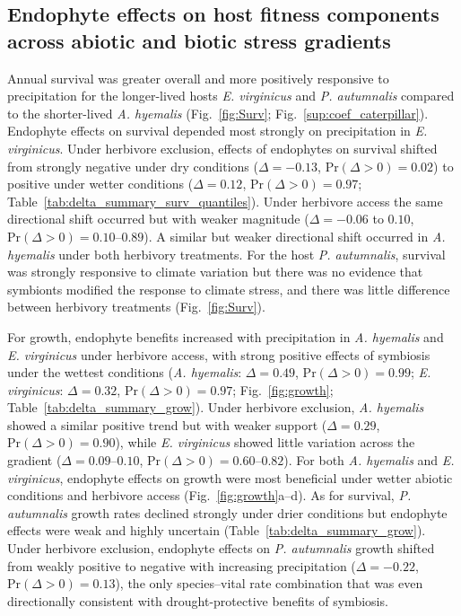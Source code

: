 \documentclass[12pt]{article}\usepackage[]{graphicx}\usepackage[dvipsnames]{xcolor}
\begin{document}
\subsection*{Endophyte effects on host fitness components across abiotic and biotic stress gradients}
Annual survival was greater overall and more positively responsive to precipitation for the longer-lived hosts \textit{E. virginicus} and \textit{P. autumnalis} compared to the shorter-lived \textit{A. hyemalis} (Fig.~\ref{fig:Surv}; Fig.~\ref{sup:coef_caterpillar}).
Endophyte effects on survival depended most strongly on precipitation in \textit{E. virginicus}. 
Under herbivore exclusion, effects of endophytes on survival shifted from strongly negative under dry conditions ($\Delta = -0.13$, $\mathrm{Pr}(\Delta > 0) = 0.02$) to positive under wetter conditions ($\Delta = 0.12$, $\mathrm{Pr}(\Delta > 0) = 0.97$; Table~\ref{tab:delta_summary_surv_quantiles}). 
Under herbivore access the same directional shift occurred but with weaker magnitude ($\Delta = -0.06$ to $0.10$, $\mathrm{Pr}(\Delta > 0) = 0.10$--$0.89$). 
A similar but weaker directional shift occurred in \textit{A. hyemalis} under both herbivory treatments.
For the host \textit{P. autumnalis}, survival was strongly responsive to climate variation but there was no evidence that symbionts modified the response to climate stress, and there was little difference between herbivory treatments (Fig.~\ref{fig:Surv}).

For growth, endophyte benefits increased with precipitation in \textit{A. hyemalis} and \textit{E. virginicus} under herbivore access, with strong positive effects of symbiosis under the wettest conditions (\textit{A. hyemalis}: $\Delta = 0.49$, $\mathrm{Pr}(\Delta > 0) = 0.99$; \textit{E. virginicus}: $\Delta = 0.32$, $\mathrm{Pr}(\Delta > 0) = 0.97$; Fig.~\ref{fig:growth}; Table~\ref{tab:delta_summary_grow}). 
Under herbivore exclusion, \textit{A. hyemalis} showed a similar positive trend but with weaker support ($\Delta = 0.29$, $\mathrm{Pr}(\Delta > 0) = 0.90$), while \textit{E. virginicus} showed little variation across the gradient ($\Delta = 0.09$--$0.10$, $\mathrm{Pr}(\Delta > 0) = 0.60$--$0.82$). 
For both \textit{A. hyemalis} and \textit{E. virginicus}, endophyte effects on growth were most beneficial under wetter abiotic conditions and herbivore access (Fig.~\ref{fig:growth}a--d). 
As for survival, \textit{P. autumnalis} growth rates declined strongly under drier conditions but endophyte effects were weak and highly uncertain (Table~\ref{tab:delta_summary_grow}). 
Under herbivore exclusion, endophyte effects on \textit{P. autumnalis} growth shifted from weakly positive to negative with increasing precipitation ($\Delta = -0.22$, $\mathrm{Pr}(\Delta > 0) = 0.13$), the only species–vital rate combination that was even directionally consistent with drought-protective benefits of symbiosis.
\end{document}
